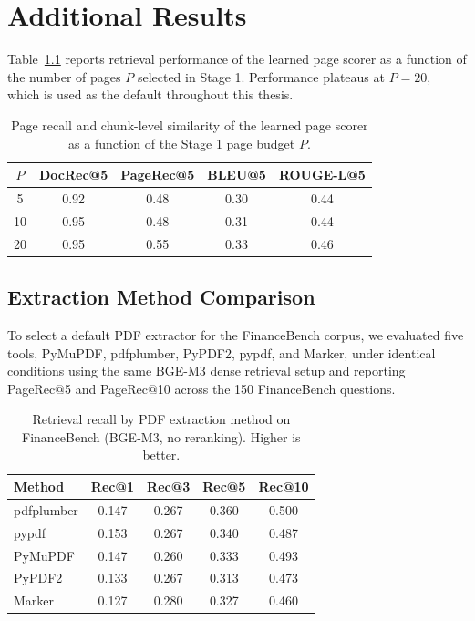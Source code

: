 \documentclass[12pt,twoside,maitrise]{dms}
\theoremstyle{definition}
\numberwithin{equation}{section}
\numberwithin{table}{chapter}
\numberwithin{figure}{chapter}
\begin{document}
\chapter{Additional Results}
\label{app:page_ablation}

Table~\ref{tab:page_ablation} reports retrieval performance of the learned page scorer
as a function of the number of pages $P$ selected in Stage 1. Performance plateaus at
$P=20$, which is used as the default throughout this thesis.

\begin{table}[ht]
\centering
\caption{Page recall and chunk-level similarity of the learned page scorer as a
  function of the Stage 1 page budget $P$.}
\label{tab:page_ablation}
\begin{tabular}{ccccc}
\toprule
$P$ & DocRec@5 & PageRec@5 & BLEU@5 & ROUGE-L@5 \\
\midrule
5  & 0.92 & 0.48 & 0.30 & 0.44 \\
10 & 0.95 & 0.48 & 0.31 & 0.44 \\
20 & 0.95 & 0.55 & 0.33 & 0.46 \\
\bottomrule
\end{tabular}
\end{table}


\section{Extraction Method Comparison}
\label{app:extraction-comparison}

To select a default PDF extractor for the FinanceBench corpus, we evaluated five
tools, PyMuPDF, pdfplumber, PyPDF2, pypdf, and Marker, under identical conditions
using the same BGE-M3 dense retrieval setup and reporting PageRec@5 and PageRec@10
across the 150 FinanceBench questions.

\begin{table}[ht]
\centering
\caption{Retrieval recall by PDF extraction method on FinanceBench (BGE-M3, no
reranking). Higher is better.}
\label{tab:extraction-comparison}
\begin{tabular}{lcccc}
\toprule
\textbf{Method} & \textbf{Rec@1} & \textbf{Rec@3} & \textbf{Rec@5} & \textbf{Rec@10} \\
\midrule
pdfplumber & 0.147 & 0.267 & 0.360 & 0.500 \\
pypdf      & 0.153 & 0.267 & 0.340 & 0.487 \\
PyMuPDF    & 0.147 & 0.260 & 0.333 & 0.493 \\
PyPDF2     & 0.133 & 0.267 & 0.313 & 0.473 \\
Marker     & 0.127 & 0.280 & 0.327 & 0.460 \\
\bottomrule
\end{tabular}
\end{table}
\end{document}
